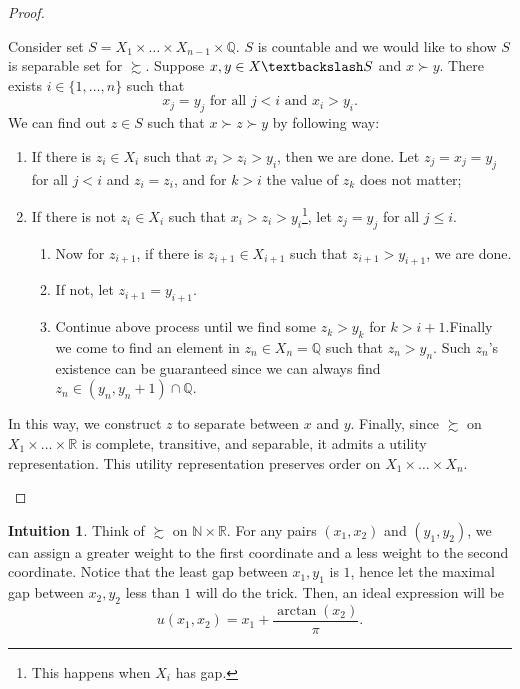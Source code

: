 \documentclass[a4paper, 12pt]{article}
\theoremstyle{definition}
\newtheorem{intuition}{Intuition}
\newcommand{\minus}{\textbackslash}
\begin{document}
\begin{proof}
\begin{enumerate}[label = (\roman*)]
Consider set $S=X_1\times\dots\times X_{n-1}\times\mathbb{Q}$. $S$ is countable and  we would like to show $S$ is separable set for $\succsim$. Suppose $x,y\in X\minus S$ and $x\succ y$. There exists $i\in\{1,\dots,n\}$ such that 
\[
x_j=y_j\text{ for all }j<i\text{ and }x_i>y_i.
\]
We can find out $z\in S$ such that $x\succ z\succ y$ by following way:
\begin{enumerate}
\item If there is $z_i\in X_i$ such that $x_i>z_i>y_i$, then we are done. Let $z_j=x_j=y_j$ for all $j<i$ and $z_i=z_i$, and for $k>i$ the value of $z_k$ does not matter;
\item If there is not $z_i\in X_i$ such that $x_i>z_i>y_i$\footnote{This happens when $X_i$ has gap.}, let $z_j=y_j$ for all $j\leq i$. 
\begin{enumerate}
\item Now for $z_{i+1}$, if there is $z_{i+1}\in X_{i+1}$ such that $z_{i+1}>y_{i+1}$, we are done. 
\item If not, let $z_{i+1}=y_{i+1}$.
\item Continue above process until we find some $z_{k}>y_k$ for $k> i+1$.Finally we come to find an element in $z_n\in X_n=\mathbb{Q}$ such that $z_n>y_n$. Such $z_n$'s existence can be guaranteed since we can always find $z_n\in (y_n,y_n+1)\cap\mathbb{Q}$.
\end{enumerate}
\end{enumerate}
In this way, we construct $z$ to separate between $x$ and $y$. Finally, since $\succsim$ on $X_1\times\dots\times\mathbb{R}$ is complete, transitive, and separable, it admits a utility representation. This utility representation preserves order on $X_1\times\dots\times X_n$.
\end{enumerate}
\end{proof}

\begin{intuition}
Think of $\succsim$ on $\mathbb{N}\times\mathbb{R}$. For any pairs $(x_1,x_2)$ and $(y_1,y_2)$, we can assign a greater weight to the first coordinate and a less weight to the second coordinate. Notice that the least gap between $x_1,y_1$ is $1$, hence let the maximal gap between $x_2,y_2$ less than $1$ will do the trick. Then, an ideal expression will be
\[
u(x_1,x_2)=x_1+\frac{\arctan(x_2)}{\pi}.
\]
\end{intuition}
\end{document}
